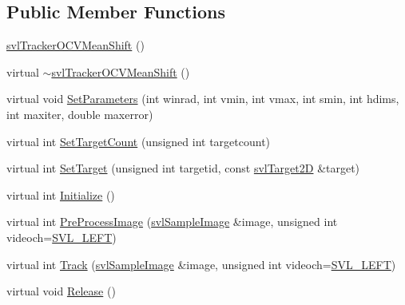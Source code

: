 \subsection*{Public Member Functions}
\begin{DoxyCompactItemize}
\item 
\hyperlink{classsvl_tracker_o_c_v_mean_shift_a3d3446eced3addc41fca298f43703e15}{svl\+Tracker\+O\+C\+V\+Mean\+Shift} ()
\item 
virtual \hyperlink{classsvl_tracker_o_c_v_mean_shift_a7ea83fe3b1d9bfbee4358dc97067eaea}{$\sim$svl\+Tracker\+O\+C\+V\+Mean\+Shift} ()
\item 
virtual void \hyperlink{classsvl_tracker_o_c_v_mean_shift_aef31184a9ab91ca20bc329a4af22ce9a}{Set\+Parameters} (int winrad, int vmin, int vmax, int smin, int hdims, int maxiter, double maxerror)
\item 
virtual int \hyperlink{classsvl_tracker_o_c_v_mean_shift_a323dbe231d319def26e8ce46b734e375}{Set\+Target\+Count} (unsigned int targetcount)
\item 
virtual int \hyperlink{classsvl_tracker_o_c_v_mean_shift_a681e10fbccb458b343bbb3b873a88cab}{Set\+Target} (unsigned int targetid, const \hyperlink{structsvl_target2_d}{svl\+Target2\+D} \&target)
\item 
virtual int \hyperlink{classsvl_tracker_o_c_v_mean_shift_a87583574f4821796798cb340df2b2133}{Initialize} ()
\item 
virtual int \hyperlink{classsvl_tracker_o_c_v_mean_shift_a7a0b8229b75ef85b5aff257df2fcb2cd}{Pre\+Process\+Image} (\hyperlink{classsvl_sample_image}{svl\+Sample\+Image} \&image, unsigned int videoch=\hyperlink{svl_definitions_8h_ab9fec7615f19c8df2919eebcab0b187f}{S\+V\+L\+\_\+\+L\+E\+F\+T})
\item 
virtual int \hyperlink{classsvl_tracker_o_c_v_mean_shift_a35c6c70d76bd53e08fd023e45c8aafe8}{Track} (\hyperlink{classsvl_sample_image}{svl\+Sample\+Image} \&image, unsigned int videoch=\hyperlink{svl_definitions_8h_ab9fec7615f19c8df2919eebcab0b187f}{S\+V\+L\+\_\+\+L\+E\+F\+T})
\item 
virtual void \hyperlink{classsvl_tracker_o_c_v_mean_shift_ae2cf254b0fab604a2d5384a4aa9b97c3}{Release} ()
\end{DoxyCompactItemize}
